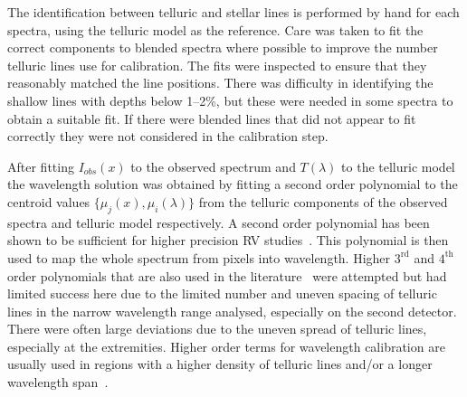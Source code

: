 The identification between telluric and stellar lines is performed by hand for each spectra, using the telluric model as the reference.
Care was taken to fit the correct components to blended spectra where possible to improve the number telluric lines use for calibration.
The fits were inspected to ensure that they reasonably matched the line positions.
There was difficulty in identifying the shallow lines with depths below 1--2\%, but these were needed in some spectra to obtain a suitable fit.
If there were blended lines that did not appear to fit correctly they were not considered in the calibration step.

After fitting \(I_{obs}(x)\) to the observed spectrum and \(T(\lambda)\) to the telluric model the wavelength solution was obtained by fitting a second order polynomial to the centroid values \(\{\mu_{j}(x), \mu_{i}(\lambda)\}\) from the telluric components of the observed spectra and telluric model respectively.
A second order polynomial has been shown to be sufficient for higher precision {RV} studies~\citep[e.g.][]{bean_groundbased_2010, figueira_radial_2010}.
This polynomial is then used to map the whole spectrum from pixels into wavelength.
Higher \(3^{\textrm{rd}}\) and \(4^{\textrm{th}}\) order polynomials that are also used in the literature~\citet[e.g.][]{seifahrt_synthesising_2010, ulmer-moll_telluric_2018} were attempted but had limited success here due to the limited number and uneven spacing of telluric lines in the narrow wavelength range analysed, especially on the second detector.
There were often large deviations due to the uneven spread of telluric lines, especially at the extremities.
Higher order terms for wavelength calibration are usually used in regions with a higher density of telluric lines and/or a longer wavelength span~\citep{piskorz_evidence_2016, seifahrt_synthesising_2010, ulmer-moll_telluric_2018}.

